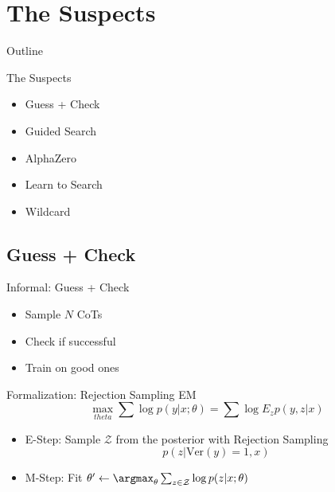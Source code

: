 \documentclass[14pt,aspectratio=169]{beamer}
\begin{document}
\section{The Suspects}

\begin{frame}{Outline}
	\tableofcontents[sections]
\end{frame}

\begin{frame}{The Suspects}
	\begin{itemize}
		\item Guess + Check
		\item Guided Search
		\item AlphaZero
		\item Learn to Search
		\item Wildcard
	\end{itemize}
\end{frame}



\subsection{Guess + Check}

\begin{frame}{Informal: Guess + Check}
	\begin{itemize}
		\item Sample $N$ CoTs
		\item Check if successful
		\item Train on good ones
	\end{itemize}
\end{frame}

\begin{frame}{Formalization: Rejection Sampling EM}
	$$\max_{theta} \sum \log p(y | x; \theta) = \sum \log E_{z} p(y, z | x)$$
	\begin{itemize}
		\item E-Step: Sample $\mathcal{Z}$ from the posterior with Rejection Sampling
		      \[ p(z | \text{Ver}(y)=1, x) \]
		\item M-Step: Fit $\theta' \gets \argmax_{\theta}
			      \sum_{z\in \mathcal{Z}} \log p(z | x;\theta)$
	\end{itemize}
\end{frame}
\end{document}
